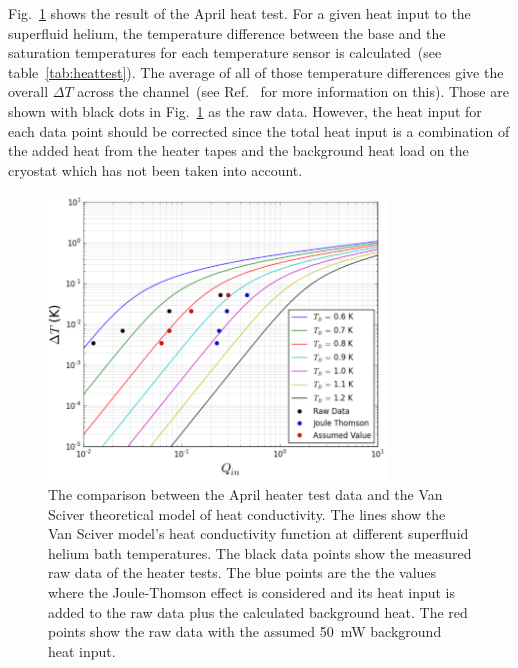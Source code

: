 Fig.~\ref{fig:April_Data} shows the result of the April heat test.
For a given heat input to the superfluid helium, the temperature
difference between the base and the saturation temperatures for each
temperature sensor is calculated~(see table~\ref{tab:heattest}). The
average of all of those temperature differences give the overall
$\Delta T$ across the channel~(see Ref.~\cite{Florian_thesis} for more
information on this). Those are shown with black dots in
Fig.~\ref{fig:April_Data} as the raw data. However, the heat input for
each data point should be corrected since the total heat input is a
combination of the added heat from the heater tapes and the background
heat load on the cryostat which has not been taken into account.


\begin{figure}[h!]
  \centering \includegraphics[width=0.8\textwidth]{April_Data.png}
  \caption[Comparison between the April heater test data and
  theoretical model of Van Sciver]{The comparison between the April
    heater test data and the Van Sciver theoretical model of heat
    conductivity. The lines show the Van Sciver model's heat
    conductivity function at different superfluid helium bath
    temperatures. The black data points show the measured raw data of
    the heater tests. The blue points are the the values where the
    Joule-Thomson effect is considered and its heat input is added to
    the raw data plus the calculated background heat. The red points
    show the raw data with the assumed 50~mW background heat input.}
\label{fig:April_Data}
\end{figure}


